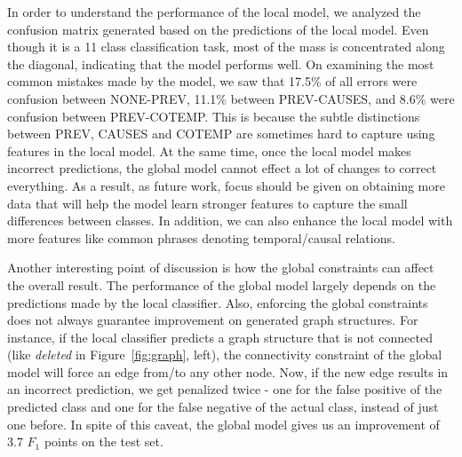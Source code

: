In order to understand the performance of the local model, we analyzed the confusion matrix generated based on the predictions of the local model. Even though it is a 11 class classification task, most of the mass is concentrated along the diagonal, indicating that the model performs well. On examining the most common mistakes made by the model, we saw that 17.5\% of all errors were confusion between NONE-PREV, 11.1\% between PREV-CAUSES, and 8.6\% were confusion between PREV-COTEMP. This is because the subtle distinctions between PREV, CAUSES and COTEMP are sometimes hard to capture using features in the local model. At the same time, once the local model makes incorrect predictions, the global model cannot effect a lot of changes to correct everything. As a result, as future work, focus should be given on obtaining more data that will help the model learn stronger features to capture the small differences between classes. In addition, we can also enhance the local model with more features like common phrases denoting temporal/causal relations.

Another interesting point of discussion is how the global constraints can affect the overall result. The performance of the global model largely depends on the predictions made by the local classifier. Also, enforcing the global constraints does not always guarantee improvement on generated graph structures. For instance, if the local classifier predicts a graph structure that is not connected (like \emph{deleted} in Figure~\ref{fig:graph}, left), the connectivity constraint of the global model will force an edge from/to any other node. Now, if the new edge results in an incorrect prediction, we get penalized twice - one for the false positive of the predicted class and one for the false negative of the actual class, instead of just one before. In spite of this caveat, the global model gives us an improvement of 3.7 $F_{1}$ points on the test set.
